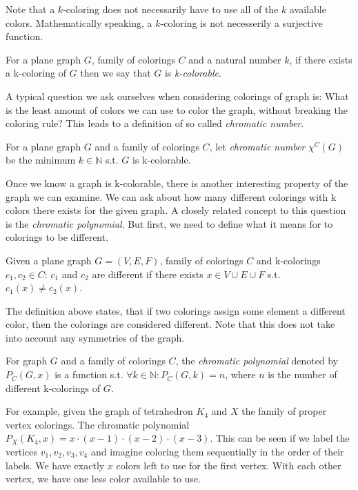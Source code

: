 Note that a $k$-coloring does not necessarily have to use all of the $k$ available colors. Mathematically speaking, a $k$-coloring is not necesserily a surjective function.

\begin{definition}
    For a plane graph $G$, family of colorings $C$ and a natural number $k$, if there exists a k-coloring of $G$ then we say that $G$ is \textit{k-colorable}.
\end{definition}

A typical question we ask ourselves when considering colorings of graph is: What is the least amount of colors we can use to color the graph, without breaking the coloring rule? This leads to a definition of so called \textit{chromatic number}. 


\begin{definition}
    For a plane graph $G$ and a family of colorings $C$, let \textit{chromatic number} $\chi ^C (G)$ be the minimum $k \in \mathbb{N}$ s.t. $G$ is k-colorable.
\end{definition}

Once we know a graph is k-colorable, there is another interesting property of the graph we can examine. We can ask about how many different colorings with k colors there exists for the given graph. A closely related concept to this question is the \textit{chromatic polynomial}. But first, we need to define what it means for to colorings to be different.

\begin{definition}
    Given a plane graph $G=(V,E,F)$, family of colorings $C$ and k-colorings $c_1,c_2 \in C$: $c_1$ and $c_2$ are different if there exists $x \in V \cup E \cup F$ s.t. $c_1(x) \neq c_2(x)$.
\end{definition}

The definition above states, that if two colorings assign some element a different color, then the colorings are considered different. Note that this does not take into account any symmetries of the graph.

\begin{definition}
    For graph $G$ and a family of colorings $C$, the \textit{chromatic polynomial} denoted by $P_{C}(G,x)$ is a function s.t. $\forall k \in \mathbb{N} : P_C(G,k) = n$, where $n$ is the number of different k-colorings of $G$.
\end{definition}

For example, given the graph of tetrahedron $K_4$ and $X$ the family of proper vertex colorings. The chromatic polynomial $P_{X}(K_4,x) = x \cdot (x-1) \cdot (x-2) \cdot (x-3)$. This can be seen if we label the vertices $v_1,v_2,v_3,v_4$ and imagine coloring them sequentially in the order of their labels. We have exactly $x$ colors left to use for the first vertex. With each other vertex, we have one less color available to use. 

